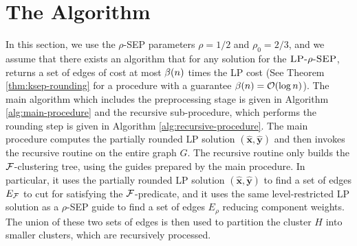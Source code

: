 ﻿    \section{The Algorithm}

    In this section, we use the \textsc{$\rho$-SEP} parameters $\rho=1/2$ and $\rho_0=2/3$, and we assume that there exists an algorithm that for any solution for the $\textsc{LP-$\rho$-SEP}$, returns a set of edges of cost at most $\beta\mathopen{}\left( n \right)$ times the \textsc{LP} cost (See Theorem \ref{thm:ksep-rounding} for a procedure with a guarantee $\beta\mathopen{}\left( n \right)=\mathcal{O}\mathopen{}\left( \log n \right)$). The main algorithm which includes the preprocessing stage is given in Algorithm \ref{alg:main-procedure} and the recursive sub-procedure, which performs the rounding step is given in Algorithm \ref{alg:recursive-procedure}. The main procedure computes the partially rounded \textsc{LP} solution $(\hat{\mathbf{x}},\hat{\mathbf{y}})$ and then invokes the recursive routine on the entire graph $G$. The recursive routine only builds the $\mathcal{F}$-clustering tree, using the guides prepared by the main procedure. In particular, it uses the partially rounded \textsc{LP} solution $(\hat{\mathbf{x}},\hat{\mathbf{y}})$ to find a set of edges $E_{\mathcal{F}}$ to cut for satisfying the $\mathcal{F}$-predicate, and it uses the same level-restricted \textsc{LP} solution as a \textsc{$\rho$-SEP} guide to find a set of edges $E_{\rho}$ reducing component weights. The union of these two sets of edges is then used to partition the cluster $H$ into smaller clusters, which are recursively processed.

    
    

